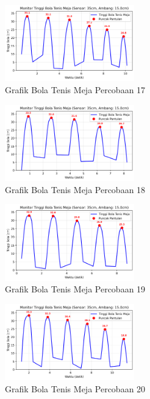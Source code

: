 \begin{figure}[htbp]
    \centering
    \includegraphics[width=0.5\textwidth]{chapters/DataPercobaan/Grafik_Bola_Tenis_Meja_17.png}
    \caption{Grafik Bola Tenis Meja Percobaan 17}
\end{figure}
\begin{figure}[htbp]
    \centering
    \includegraphics[width=0.5\textwidth]{chapters/DataPercobaan/Grafik_Bola_Tenis_Meja_18.png}
    \caption{Grafik Bola Tenis Meja Percobaan 18}
\end{figure}
\begin{figure}[htbp]
    \centering
    \includegraphics[width=0.5\textwidth]{chapters/DataPercobaan/Grafik_Bola_Tenis_Meja_19.png}
    \caption{Grafik Bola Tenis Meja Percobaan 19}
\end{figure}
\begin{figure}[htbp]
    \centering
    \includegraphics[width=0.5\textwidth]{chapters/DataPercobaan/Grafik_Bola_Tenis_Meja_20.png}
    \caption{Grafik Bola Tenis Meja Percobaan 20}
\end{figure}


